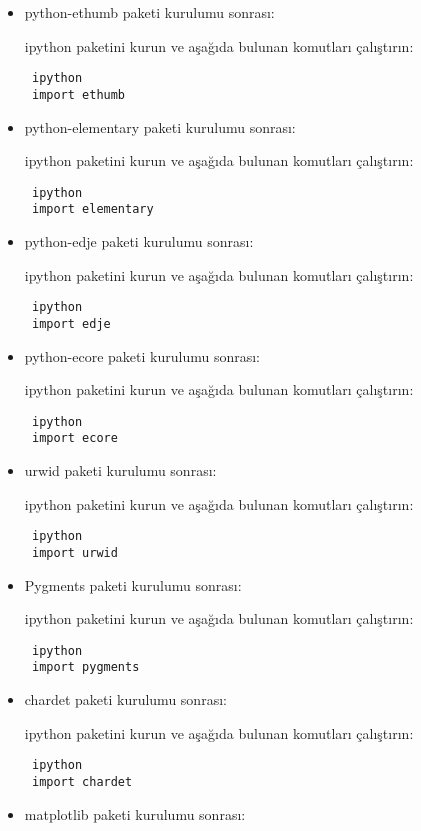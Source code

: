 \documentclass[a4paper,10pt]{article}
\begin{document}
\begin{itemize}
\item python-ethumb paketi kurulumu sonrası:

ipython paketini kurun ve aşağıda bulunan komutları çalıştırın:
\begin{verbatim}
 ipython
 import ethumb
\end{verbatim}

\item python-elementary paketi kurulumu sonrası:

ipython paketini kurun ve aşağıda bulunan komutları çalıştırın:
\begin{verbatim}
 ipython
 import elementary
\end{verbatim}

\item python-edje paketi kurulumu sonrası:

ipython paketini kurun ve aşağıda bulunan komutları çalıştırın:
\begin{verbatim}
 ipython
 import edje
\end{verbatim}



\item python-ecore paketi kurulumu sonrası:

ipython paketini kurun ve aşağıda bulunan komutları çalıştırın:
\begin{verbatim}
 ipython
 import ecore
\end{verbatim}


\item urwid paketi kurulumu sonrası:

ipython paketini kurun ve aşağıda bulunan komutları çalıştırın:
\begin{verbatim}
 ipython
 import urwid
\end{verbatim}


\item Pygments paketi kurulumu sonrası:

ipython paketini kurun ve aşağıda bulunan komutları çalıştırın:
\begin{verbatim}
 ipython
 import pygments
\end{verbatim}

\item chardet paketi kurulumu sonrası:

ipython paketini kurun ve aşağıda bulunan komutları çalıştırın:
\begin{verbatim}
 ipython
 import chardet
\end{verbatim}

\item matplotlib paketi kurulumu sonrası:


\end{itemize}
\end{document}
